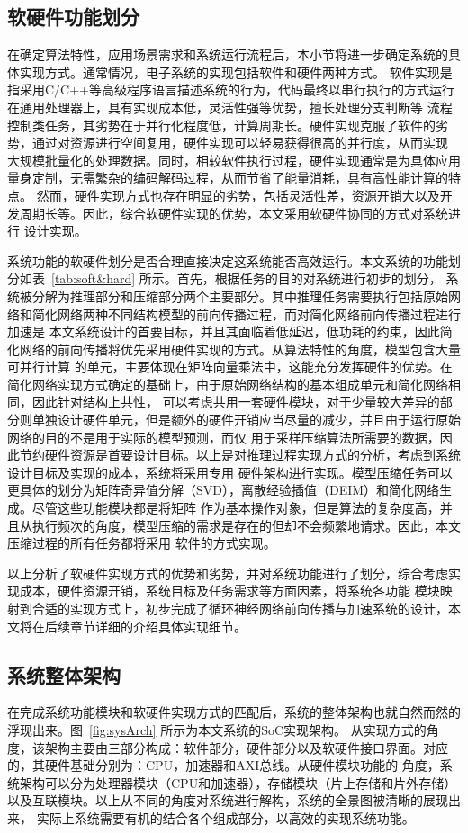 \subsection{软硬件功能划分}
在确定算法特性，应用场景需求和系统运行流程后，本小节将进一步确定系统的具体实现方式。通常情况，电子系统的实现包括软件和硬件两种方式。
软件实现是指采用C/C++等高级程序语言描述系统的行为，代码最终以串行执行的方式运行在通用处理器上，具有实现成本低，灵活性强等优势，擅长处理分支判断等
流程控制类任务，其劣势在于并行化程度低，计算周期长。硬件实现克服了软件的劣势，通过对资源进行空间复用，硬件实现可以轻易获得很高的并行度，从而实现
大规模批量化的处理数据。同时，相较软件执行过程，硬件实现通常是为具体应用量身定制，无需繁杂的编码解码过程，从而节省了能量消耗，具有高性能计算的特点。
然而，硬件实现方式也存在明显的劣势，包括灵活性差，资源开销大以及开发周期长等。因此，综合软硬件实现的优势，本文采用软硬件协同的方式对系统进行
设计实现。

系统功能的软硬件划分是否合理直接决定这系统能否高效运行。本文系统的功能划分如表~\ref{tab:soft&hard} 所示。首先，根据任务的目的对系统进行初步的划分，
系统被分解为推理部分和压缩部分两个主要部分。其中推理任务需要执行包括原始网络和简化网络两种不同结构模型的前向传播过程，而对简化网络前向传播过程进行加速是
本文系统设计的首要目标，并且其面临着低延迟，低功耗的约束，因此简化网络的前向传播将优先采用硬件实现的方式。从算法特性的角度，模型包含大量可并行计算
的单元，主要体现在矩阵向量乘法中，这能充分发挥硬件的优势。在简化网络实现方式确定的基础上，由于原始网络结构的基本组成单元和简化网络相同，因此针对结构上共性，
可以考虑共用一套硬件模块，对于少量较大差异的部分则单独设计硬件单元，但是额外的硬件开销应当尽量的减少，并且由于运行原始网络的目的不是用于实际的模型预测，而仅
用于采样压缩算法所需要的数据，因此节约硬件资源是首要设计目标。以上是对推理过程实现方式的分析，考虑到系统设计目标及实现的成本，系统将采用专用
硬件架构进行实现。模型压缩任务可以更具体的划分为矩阵奇异值分解（SVD），离散经验插值（DEIM）和简化网络生成。尽管这些功能模块都是将矩阵
作为基本操作对象，但是算法的复杂度高，并且从执行频次的角度，模型压缩的需求是存在的但却不会频繁地请求。因此，本文压缩过程的所有任务都将采用
软件的方式实现。

\vspace{-3em}

以上分析了软硬件实现方式的优势和劣势，并对系统功能进行了划分，综合考虑实现成本，硬件资源开销，系统目标及任务需求等方面因素，将系统各功能
模块映射到合适的实现方式上，初步完成了循环神经网络前向传播与加速系统的设计，本文将在后续章节详细的介绍具体实现细节。
\subsection{系统整体架构}
在完成系统功能模块和软硬件实现方式的匹配后，系统的整体架构也就自然而然的浮现出来。图~\ref{fig:sysArch} 所示为本文系统的SoC实现架构。
从实现方式的角度，该架构主要由三部分构成：软件部分，硬件部分以及软硬件接口界面。对应的，其硬件基础分别为：CPU，加速器和AXI总线。从硬件模块功能的
角度，系统架构可以分为处理器模块（CPU和加速器），存储模块（片上存储和片外存储）以及互联模块。以上从不同的角度对系统进行解构，系统的全景图被清晰的展现出来，
实际上系统需要有机的结合各个组成部分，以高效的实现系统功能。

